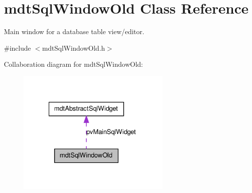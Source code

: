 \hypertarget{classmdt_sql_window_old}{
\section{mdtSqlWindowOld Class Reference}
\label{classmdt_sql_window_old}
}


Main window for a database table view/editor.  




{\ttfamily \#include $<$mdtSqlWindowOld.h$>$}



Collaboration diagram for mdtSqlWindowOld:
\nopagebreak
\begin{figure}[H]
\begin{center}
\leavevmode
\includegraphics[width=214pt]{classmdt_sql_window_old__coll__graph}
\end{center}
\end{figure}
